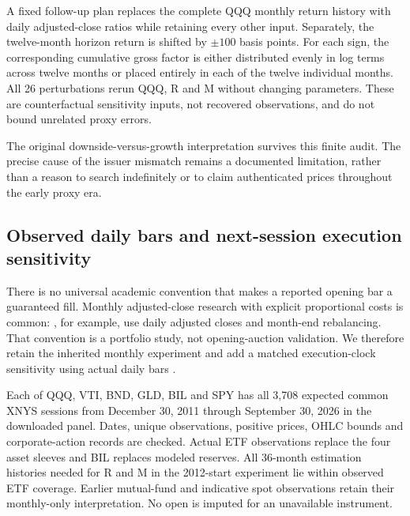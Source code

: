 A fixed follow-up plan replaces the complete QQQ monthly return history with daily adjusted-close ratios while retaining every other input. Separately, the twelve-month horizon return is shifted by $\pm100$ basis points. For each sign, the corresponding cumulative gross factor is either distributed evenly in log terms across twelve months or placed entirely in each of the twelve individual months. All 26 perturbations rerun QQQ, R and M without changing parameters. These are counterfactual sensitivity inputs, not recovered observations, and do not bound unrelated proxy errors.

The original downside-versus-growth interpretation survives this finite audit. The precise cause of the issuer mismatch remains a documented limitation, rather than a reason to search indefinitely or to claim authenticated prices throughout the early proxy era.

\subsection{Observed daily bars and next-session execution sensitivity}
There is no universal academic convention that makes a reported opening bar a guaranteed fill. Monthly adjusted-close research with explicit proportional costs is common: \citet{devanathan2026}, for example, use daily adjusted closes and month-end rebalancing. That convention is a portfolio study, not opening-auction validation. We therefore retain the inherited monthly experiment and add a matched execution-clock sensitivity using actual daily bars \citep{yahoo2026daily}.

Each of QQQ, VTI, BND, GLD, BIL and SPY has all 3,708 expected common XNYS sessions from December 30, 2011 through September 30, 2026 in the downloaded panel. Dates, unique observations, positive prices, OHLC bounds and corporate-action records are checked. Actual ETF observations replace the four asset sleeves and BIL replaces modeled reserves. All 36-month estimation histories needed for R and M in the 2012-start experiment lie within observed ETF coverage. Earlier mutual-fund and indicative spot observations retain their monthly-only interpretation. No open is imputed for an unavailable instrument.

